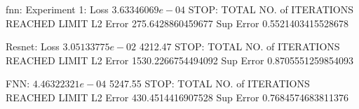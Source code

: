 fnn: Experiment 1: Loss $3.63346069e-04$ 
STOP: TOTAL NO. of ITERATIONS REACHED LIMIT
L2 Error 275.6428860459677
Sup Error 0.5521403415528678


Resnet: Loss  $3.05133775e-02$   4212.47
STOP: TOTAL NO. of ITERATIONS REACHED LIMIT
L2 Error 1530.2266754494092
Sup Error 0.8705551259854093

FNN: $4.46322321e-04$  5247.55
STOP: TOTAL NO. of ITERATIONS REACHED LIMIT
L2 Error 430.4514416907528
Sup Error 0.7684574683811376
